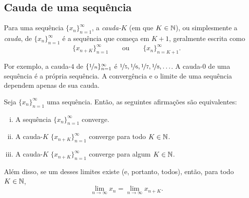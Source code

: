 \subsection{Cauda de uma sequência}

\begin{defn}
Para uma sequência $\{ x_n \}_{n=1}^\infty$,
a \emph{cauda-$K$} (em que $K \in {\mathbb{N}}$), ou simplesmente a
\emph{cauda}, de
$\{ x_n \}_{n=1}^\infty$ é a sequência que começa em $K+1$, geralmente
escrita como
\begin{equation*}
\{ x_{n+K} \}_{n=1}^\infty
\qquad \text{ou} \qquad \{ x_n \}_{n=K+1}^\infty .
\end{equation*}
\end{defn}

Por exemplo, a cauda-$4$ de $\{ \nicefrac{1}{n} \}_{n=1}^\infty$ é
$\nicefrac{1}{5}, \nicefrac{1}{6}, \nicefrac{1}{7}, \nicefrac{1}{8},
\ldots$. A cauda-$0$ de uma sequência é a própria sequência.
A convergência e o limite de uma sequência dependem apenas de sua cauda.

\begin{prop}
Seja $\{ x_n \}_{n=1}^\infty$ uma sequência. Então, as seguintes
afirmações são equivalentes:
\begin{enumerate}[(i)]
\item \label{prop:ktail:i}
A sequência $\{ x_n \}_{n=1}^\infty$ converge.
\item \label{prop:ktail:ii}
A cauda-$K$ $\{ x_{n+K} \}_{n=1}^\infty$ converge para todo $K \in {\mathbb{N}}$.
\item \label{prop:ktail:iii}
A cauda-$K$ $\{ x_{n+K} \}_{n=1}^\infty$ converge para algum $K \in {\mathbb{N}}$.
\end{enumerate}
Além disso, se um desses limites existe (e, portanto, todos), então, para todo $K \in {\mathbb{N}}$,
\begin{equation*}
\lim_{n\to \infty} x_n = \lim_{n \to \infty} x_{n+K} .
\end{equation*}
\end{prop}

